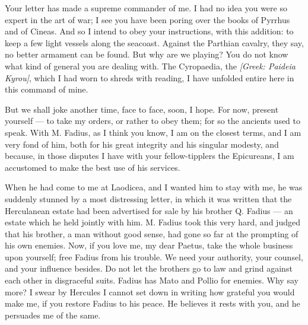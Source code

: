 

 Your letter has made a supreme commander of me. I had no idea you were so expert in the art of war; I see you have been poring over the books of Pyrrhus and of Cineas. And so I intend to obey your instructions, with this addition: to keep a few light vessels along the seacoast. Against the Parthian cavalry, they say, no better armament can be found. But why are we playing? You do not know what kind of general you are dealing with. The Cyropaedia, the \textit{[Greek: Paideia Kyrou]}, which I had worn to shreds with reading, I have unfolded entire here in this command of mine.

 But we shall joke another time, face to face, soon, I hope. For now, present yourself --- to take my orders, or rather to obey them; for so the ancients used to speak. With M. Fadius, as I think you know, I am on the closest terms, and I am very fond of him, both for his great integrity and his singular modesty, and because, in those disputes I have with your fellow-tipplers the Epicureans, I am accustomed to make the best use of his services.

 When he had come to me at Laodicea, and I wanted him to stay with me, he was suddenly stunned by a most distressing letter, in which it was written that the Herculanean estate had been advertised for sale by his brother Q. Fadius --- an estate which he held jointly with him. M. Fadius took this very hard, and judged that his brother, a man without good sense, had gone so far at the prompting of his own enemies. Now, if you love me, my dear Paetus, take the whole business upon yourself; free Fadius from his trouble. We need your authority, your counsel, and your influence besides. Do not let the brothers go to law and grind against each other in disgraceful suits. Fadius has Mato and Pollio for enemies. Why say more? I swear by Hercules I cannot set down in writing how grateful you would make me, if you restore Fadius to his peace. He believes it rests with you, and he persuades me of the same.

